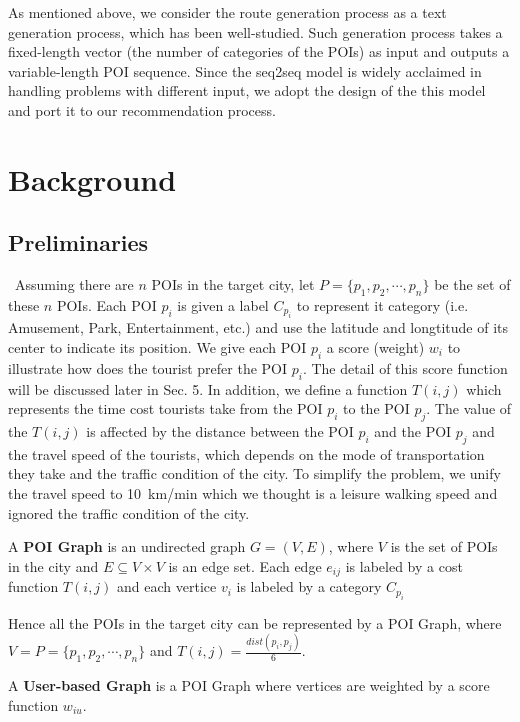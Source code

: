 \documentclass[runningheads]{llncs}
\begin{document}
As mentioned above, we consider the route generation process as a text generation process, which has been well-studied\cite{NIPS2014_5423}. Such generation process takes a fixed-length vector (the number of categories of the POIs) as input and outputs a variable-length POI sequence. Since the seq2seq model\cite{DBLP:conf/nips/SutskeverVL14} is widely acclaimed in handling problems with different input, we adopt the design of the this model and port it to our recommendation process.

\section{Background}
\subsection{Preliminaries}
\quad\, Assuming there are $n$ POIs in the target city, let $P=\{p_1,p_2,\cdots,p_n\}$ be the set of these $n$ POIs. Each POI $p_i$ is given a label $C_{p_i}$ to represent it category (i.e. Amusement, Park, Entertainment, etc.) and use the latitude and longtitude of its center to indicate its position. We give each POI $p_i$ a score (weight) $w_i$ to illustrate how does the tourist prefer the POI $p_i$. The detail of this score function will be discussed later in Sec. 5. In addition, we define a function $T(i, j)$ which represents the time cost tourists take from the POI $p_i$ to the POI $p_j$. The value of the $T(i, j)$ is affected by the distance between the POI $p_i$ and the POI $p_j$ and the travel speed of the tourists, which depends on the mode of transportation they take and the traffic condition of the city. To simplify the problem, we unify the travel speed to \SI{10}{\kilo\meter/\minute} which we thought is a leisure walking speed and ignored the traffic condition of the city. 
\begin{definition}
	A \textbf{POI Graph} is an undirected graph $G=(V,E)$, where $V$ is the set of POIs in the city and $E\subseteq V\times V$ is an edge set. Each edge $e_{ij}$ is labeled by a cost function $T(i, j)$ and each vertice $v_i$ is labeled by a category $C_{p_i}$
\end{definition}

Hence all the POIs in the target city can be represented by a POI Graph, where $V=P=\{p_1,p_2,\cdots,p_n\}$ and $T(i, j)=\frac{dist(p_i,p_j)}{6}$. 
\begin{definition}
	A \textbf{User-based Graph} is a POI Graph where vertices are weighted by a score function $w_{iu}$.
\end{definition} 
\end{document}
